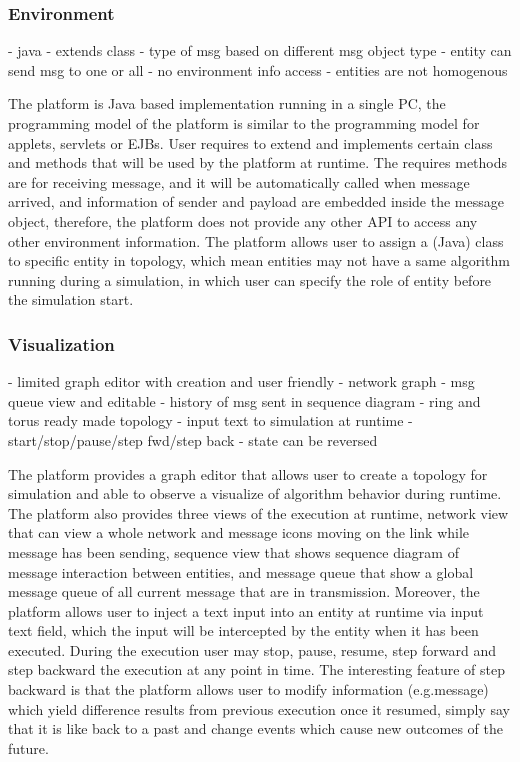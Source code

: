 \subsubsection{Environment}
- java
- extends class
- type of msg based on different msg object type
- entity can send msg to one or all
- no environment info access
- entities are not homogenous


The platform is Java based implementation running in a single PC, the programming model of the platform is similar to the programming model for applets, servlets or EJBs\cite{ref1}. User requires to extend and implements certain class and methods that will be used by the platform at runtime. The requires methods are for receiving message, and it will be automatically called when message arrived, and information of sender and payload are embedded inside the message object, therefore, the platform does not provide any other API to access any other environment information. The platform allows user to assign a (Java) class to specific entity in topology, which mean entities may not have a same algorithm running during a simulation, in which user can specify the role of entity before the simulation start.

\subsubsection{Visualization}
- limited graph editor with creation and user friendly
- network graph
- msg queue view and editable
- history of msg sent in sequence diagram
- ring and torus ready made topology
- input text to simulation at runtime
- start/stop/pause/step fwd/step back
- state can be reversed

The platform provides a graph editor that allows user to create a topology for simulation and able to observe a visualize of algorithm behavior during runtime. The platform also provides three views of the execution at runtime, network view that can view a whole network and message icons moving on the link while message has been sending, sequence view that shows sequence diagram of message interaction between entities, and message queue that show a global message queue of all current message that are in transmission. Moreover, the platform allows user to inject a text input into an entity at runtime via input text field, which the input will be intercepted by the entity when it has been executed. During the execution user may stop, pause, resume, step forward and step backward the execution at any point in time. The interesting feature of step backward is that the platform allows user to modify information (e.g.message) which yield difference results from previous execution once it resumed, simply say that it is like back to a past and change events which cause new outcomes of the future.

